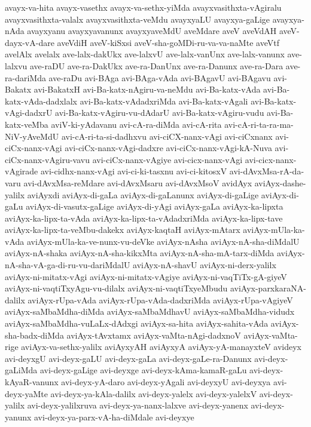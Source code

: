 {avayx-va-hita
avayx-vasethx
avayx-va-sethx-yiMda
avayxvasithxta-vAgiralu
avayxvasithxta-valalx
avayxvasithxta-veMdu
avayxyaLU
avayxya-gaLige
avayxya-nAda
avayxyanu
avayxyavanunx
avayxyaveMdU
aveMdare
aveV
aveVdAH
aveV-dayx-vA-dare
aveVdiH
aveV-kiSxsi
aveV-sha-goMDi-ru-va-va-naMte
aveVtf
avelAlx
avelalx
ave-lalx-dakUkx
ave-lalxvU
ave-lalx-vanUnx
ave-lalx-vanunx
ave-lalxvu
ave-raDU
ave-ra-DakUkx
ave-ra-DanUnx
ave-ra-Danunx
ave-ra-Dara
ave-ra-dariMda
ave-raDu
avi-BAga
avi-BAga-vAda
avi-BAgavU
avi-BAgavu
avi-Bakatx
avi-BakatxH
avi-Ba-katx-nAgiru-va-neMdu
avi-Ba-katx-vAda
avi-Ba-katx-vAda-dadxlalx
avi-Ba-katx-vAdadxriMda
avi-Ba-katx-vAgali
avi-Ba-katx-vAgi-dadxrU
avi-Ba-katx-vAgiru-vu-dAdarU
avi-Ba-katx-vAgiru-vudu
avi-Ba-katx-veMba
aviV-ki-yAdavanu
avi-cA-ra-diMda
avi-cA-rita
avi-cA-ri-ta-ra-ma-NiV-yAveMdU
avi-cA-ri-ta-si-dadhxvu
avi-ciCX-nanx-vAgi
avi-ciCxnanx
avi-ciCx-nanx-vAgi
avi-ciCx-nanx-vAgi-dadxre
avi-ciCx-nanx-vAgi-kA-Nuva
avi-ciCx-nanx-vAgiru-vavu
avi-ciCx-nanx-vAgiye
avi-cicx-nanx-vAgi
avi-cicx-nanx-vAgirade
avi-cidhx-nanx-vAgi
avi-ci-ki-tasxnu
avi-ci-kitosxV
avi-dAvxMsa-rA-da-varu
avi-dAvxMsa-reMdare
avi-dAvxMsaru
avi-dAvxMsoV
avidAyx
aviAyx-dashe-yalilx
aviAyxdi
aviAyx-di-gaLa
aviAyx-di-gaLanunx
aviAyx-di-gaLige
aviAyx-di-gaLu
aviAyx-di-vasutx-gaLige
aviAyx-di-yAgi
aviAyx-gaLa
aviAyx-ka-lipxta
aviAyx-ka-lipx-ta-vAda
aviAyx-ka-lipx-ta-vAdadxriMda
aviAyx-ka-lipx-tave
aviAyx-ka-lipx-ta-veMbu-dakekx
aviAyx-kaqtaH
aviAyx-mAtarx
aviAyx-mUla-ka-vAda
aviAyx-mUla-ka-ve-nunx-vu-deVke
aviAyx-nAsha
aviAyx-nA-sha-diMdalU
aviAyx-nA-shaka
aviAyx-nA-sha-kikxMta
aviAyx-nA-sha-mA-tarx-diMda
aviAyx-nA-sha-vA-ga-di-ru-vu-dariMdalU
aviAyx-nA-shavU
aviAyx-ni-derx-yalilx
aviAyx-ni-mitatx-vAgi
aviAyx-ni-mitatx-vAgiye
aviAyx-ni-vaqTiTx-gA-giyeV
aviAyx-ni-vaqtiTxyAgu-vu-dilalx
aviAyx-ni-vaqtiTxyeMbudu
aviAyx-parxkaraNA-dalilx
aviAyx-rUpa-vAda
aviAyx-rUpa-vAda-dadxriMda
aviAyx-rUpa-vAgiyeV
aviAyx-saMbaMdha-diMda
aviAyx-saMbaMdhavU
aviAyx-saMbaMdha-vidudx
aviAyx-saMbaMdha-vuLaLx-dAdxgi
aviAyx-sa-hita
aviAyx-sahita-vAda
aviAyx-sha-badx-diMda
aviAyx-tAvxtamx
aviAyx-vaMta-nAgi-dadxnoV
aviAyx-vaMta-rige
aviAyx-va-sethx-yalilx
aviAyxyAH
aviAyxyA
aviAyx-yA-manayxteV
avideyx
avi-deyxgU
avi-deyx-gaLU
avi-deyx-gaLa
avi-deyx-gaLe-ra-Danunx
avi-deyx-gaLiMda
avi-deyx-gaLige
avi-deyxge
avi-deyx-kAma-kamaR-gaLu
avi-deyx-kAyaR-vanunx
avi-deyx-yA-daro
avi-deyx-yAgali
avi-deyxyU
avi-deyxya
avi-deyx-yaMte
avi-deyx-ya-kAla-dalilx
avi-deyx-yalelx
avi-deyx-yalelxV
avi-deyx-yalilx
avi-deyx-yalilxruva
avi-deyx-ya-nanx-lalxve
avi-deyx-yanenx
avi-deyx-yanunx
avi-deyx-ya-parx-vA-ha-diMdale
avi-deyxye
}

